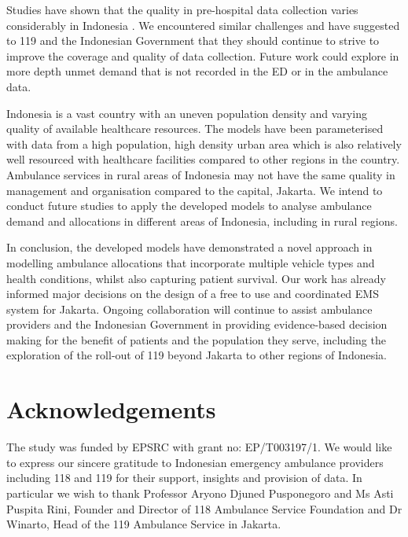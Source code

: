 \documentclass[preprint,12pt]{elsarticle}
\begin{document}
Studies have shown that the quality in pre-hospital data collection varies
considerably in Indonesia \cite{hooper2019_datacollection}. We encountered
similar challenges and have suggested to 119 and the Indonesian Government
that they should continue to strive to improve the coverage and quality of
data collection. Future work could explore in more depth unmet demand that is
not recorded in the ED or in the ambulance data.

Indonesia is a vast country with an uneven population density and varying
quality of available healthcare resources. The models have been parameterised
with data from a high population, high density urban area which is also
relatively well resourced with healthcare facilities compared to other regions
in the country. Ambulance services in rural areas of Indonesia may not have
the same quality in management and organisation compared to the capital,
Jakarta. We intend to conduct future studies to apply the developed models to
analyse ambulance demand and allocations in different areas of Indonesia,
including in rural regions.

In conclusion, the developed models have demonstrated a novel approach in
modelling ambulance allocations that incorporate multiple vehicle types and
health conditions, whilst also capturing patient survival. Our work has
already informed major decisions on the design of a free to use and
coordinated EMS system for Jakarta. Ongoing collaboration will continue to
assist ambulance providers and the Indonesian Government in providing
evidence-based decision making for the benefit of patients and the population
they serve, including the exploration of the roll-out of 119 beyond Jakarta to
other regions of Indonesia. 


\section*{Acknowledgements}
The study was funded by EPSRC with grant no: EP/T003197/1. We would like to
express our sincere gratitude to Indonesian emergency ambulance providers
including 118 and 119 for their support, insights and provision of data. In
particular we wish to thank Professor Aryono Djuned Pusponegoro and Ms Asti
Puspita Rini, Founder and Director of 118 Ambulance Service Foundation and Dr
Winarto, Head of the 119 Ambulance Service in Jakarta.


\appendix
\end{document}
